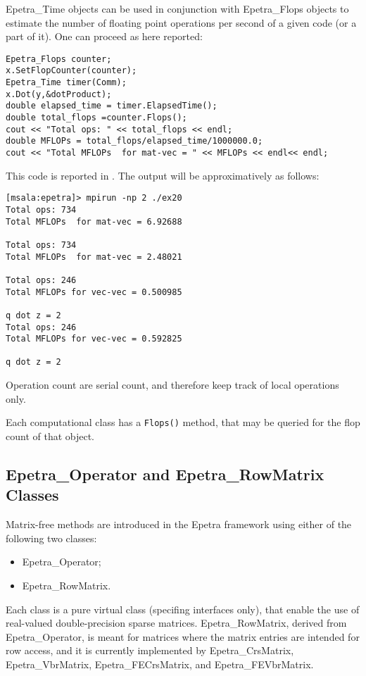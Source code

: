 Epetra\_Time objects can be used in conjunction with Epetra\_Flops
objects to estimate the number of floating point operations per second
of a given code (or a part of it). One can proceed as here reported:
\begin{verbatim}
Epetra_Flops counter;
x.SetFlopCounter(counter);
Epetra_Time timer(Comm);
x.Dot(y,&dotProduct);
double elapsed_time = timer.ElapsedTime();
double total_flops =counter.Flops();
cout << "Total ops: " << total_flops << endl;
double MFLOPs = total_flops/elapsed_time/1000000.0;
cout << "Total MFLOPs  for mat-vec = " << MFLOPs << endl<< endl;
\end{verbatim}
This code is reported in . The output will be
approximatively as follows:
\begin{verbatim}
[msala:epetra]> mpirun -np 2 ./ex20
Total ops: 734
Total MFLOPs  for mat-vec = 6.92688

Total ops: 734
Total MFLOPs  for mat-vec = 2.48021

Total ops: 246
Total MFLOPs for vec-vec = 0.500985

q dot z = 2
Total ops: 246
Total MFLOPs for vec-vec = 0.592825

q dot z = 2
\end{verbatim}

\begin{remark} Operation count are serial count, and therefore keep
  track of local operations only.
\end{remark}

\begin{remark}
  Each computational class has a \verb!Flops()! method, that may be
  queried for the flop count of that object.
\end{remark}



\subsection{Epetra\_Operator and Epetra\_RowMatrix Classes}
\label{sec:operator}

Matrix-free methods are introduced in the Epetra framework using either
of the following two classes:
\begin{itemize}
\item Epetra\_Operator;
\item Epetra\_RowMatrix.
\end{itemize}
Each class is a pure virtual class (specifing interfaces only), that
enable the use of real-valued double-precision sparse matrices.
Epetra\_RowMatrix, derived from Epetra\_Operator, is meant for matrices
where the matrix entries are intended for row access, and it is
currently implemented by Epetra\_CrsMatrix, Epetra\_VbrMatrix,
Epetra\_FECrsMatrix, and Epetra\_FEVbrMatrix.


